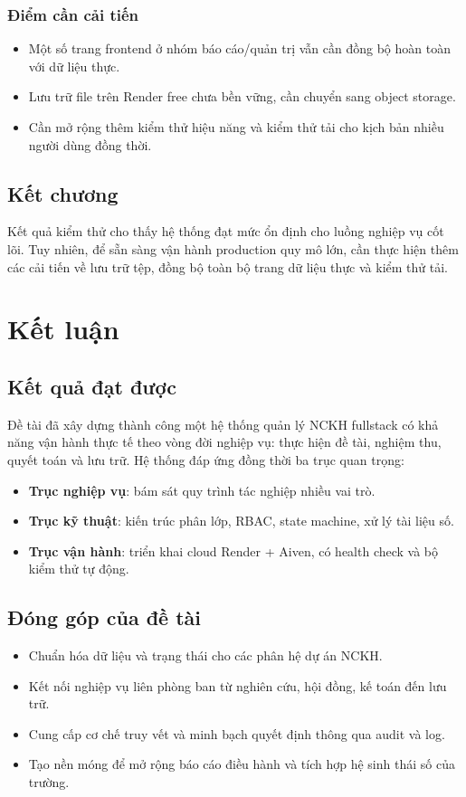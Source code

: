 \documentclass[12pt,a4paper]{report}
\begin{document}
\subsection{Điểm cần cải tiến}
\begin{itemize}[leftmargin=1.2cm]
\item Một số trang frontend ở nhóm báo cáo/quản trị vẫn cần đồng bộ hoàn toàn với dữ liệu thực.
\item Lưu trữ file trên Render free chưa bền vững, cần chuyển sang object storage.
\item Cần mở rộng thêm kiểm thử hiệu năng và kiểm thử tải cho kịch bản nhiều người dùng đồng thời.
\end{itemize}

\section{Kết chương}
Kết quả kiểm thử cho thấy hệ thống đạt mức ổn định cho luồng nghiệp vụ cốt lõi. Tuy nhiên, để sẵn sàng vận hành production quy mô lớn, cần thực hiện thêm các cải tiến về lưu trữ tệp, đồng bộ toàn bộ trang dữ liệu thực và kiểm thử tải.

\chapter{Kết luận}

\section{Kết quả đạt được}
Đề tài đã xây dựng thành công một hệ thống quản lý NCKH fullstack có khả năng vận hành thực tế theo vòng đời nghiệp vụ: thực hiện đề tài, nghiệm thu, quyết toán và lưu trữ. Hệ thống đáp ứng đồng thời ba trục quan trọng:
\begin{itemize}[leftmargin=1.2cm]
\item \textbf{Trục nghiệp vụ}: bám sát quy trình tác nghiệp nhiều vai trò.
\item \textbf{Trục kỹ thuật}: kiến trúc phân lớp, RBAC, state machine, xử lý tài liệu số.
\item \textbf{Trục vận hành}: triển khai cloud Render + Aiven, có health check và bộ kiểm thử tự động.
\end{itemize}

\section{Đóng góp của đề tài}
\begin{itemize}[leftmargin=1.2cm]
\item Chuẩn hóa dữ liệu và trạng thái cho các phân hệ dự án NCKH.
\item Kết nối nghiệp vụ liên phòng ban từ nghiên cứu, hội đồng, kế toán đến lưu trữ.
\item Cung cấp cơ chế truy vết và minh bạch quyết định thông qua audit và log.
\item Tạo nền móng để mở rộng báo cáo điều hành và tích hợp hệ sinh thái số của trường.
\end{itemize}
\end{document}
